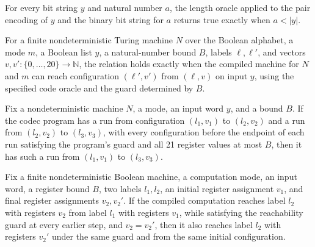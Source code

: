 \begin{lemma}
\label{Complexity.Codec.orc_len}
\leanok
{}
For every bit string $y$ and natural number $a$, the length oracle applied to the pair
encoding of $y$ and the binary bit string for $a$ returns true exactly when $a<|y|$.
\end{lemma}

\begin{definition}
\label{Complexity.Codec.Reach}
\leanok
{}
For a finite nondeterministic Turing machine $N$ over the Boolean alphabet, a mode $m$,
a Boolean list $y$, a natural-number bound $B$, labels $\ell,\ell'$, and vectors
$v,v'\colon\{0,\ldots,20\}\to\mathbb N$, the relation holds exactly when the compiled
machine for $N$ and $m$ can reach configuration $(\ell',v')$ from $(\ell,v)$ on input
$y$, using the specified code oracle and the guard determined by $B$.
\end{definition}

\begin{lemma}
\label{Complexity.Codec.Reach.trans}
\leanok
{}
Fix a nondeterministic machine $N$, a mode, an input word $y$, and a bound $B$. If the
codec program has a run from configuration $(l_1,v_1)$ to $(l_2,v_2)$ and a run from
$(l_2,v_2)$ to $(l_3,v_3)$, with every configuration before the endpoint of each run
satisfying the program's guard and all 21 register values at most $B$, then it has such
a run from $(l_1,v_1)$ to $(l_3,v_3)$.
\end{lemma}

\begin{lemma}
\label{Complexity.Codec.Reach.cast}
\leanok
{}
Fix a finite nondeterministic Boolean machine, a computation mode, an input word, a
register bound $B$, two labels $l_1,l_2$, an initial register assignment $v_1$, and
final register assignments $v_2,v_2'$. If the compiled computation reaches label $l_2$
with registers $v_2$ from label $l_1$ with registers $v_1$, while satisfying the
reachability guard at every earlier step, and $v_2=v_2'$, then it also reaches label
$l_2$ with registers $v_2'$ under the same guard and from the same initial
configuration.
\end{lemma}

